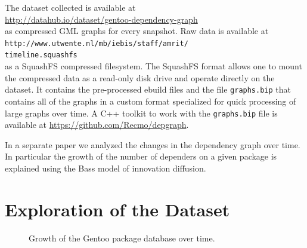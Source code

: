 \documentclass[smallextended,final]{svjour3}
\begin{document}
The dataset collected is available at
\\\url{http://datahub.io/dataset/gentoo-dependency-graph}\\
as compressed GML graphs for every snapshot. Raw data is available at
\\\texttt{http://www.utwente.nl/mb/iebis/staff/amrit/}\\\texttt{timeline.squashfs}\\
as a SquashFS compressed filesystem. The SquashFS format allows one to mount the compressed data as a read-only disk drive and operate directly on the dataset. It contains the pre-processed ebuild files and the file \verb|graphs.bip| that contains all of the graphs in a custom format specialized for quick processing of large graphs over time. A C++ toolkit to work with the \verb|graphs.bip| file is available at \url{https://github.com/Recmo/depgraph}.

In a separate paper \citep{rem142} we analyzed the changes in the dependency graph over time. In particular the growth of the number of dependers on a given package is explained using the Bass model of innovation diffusion.


\section{Exploration of the Dataset}


\begin{figure}
\small\centering
{}
\caption{Growth of the Gentoo package database over time.}\label{fig:pkgsgrowth}
\end{figure}
\end{document}
